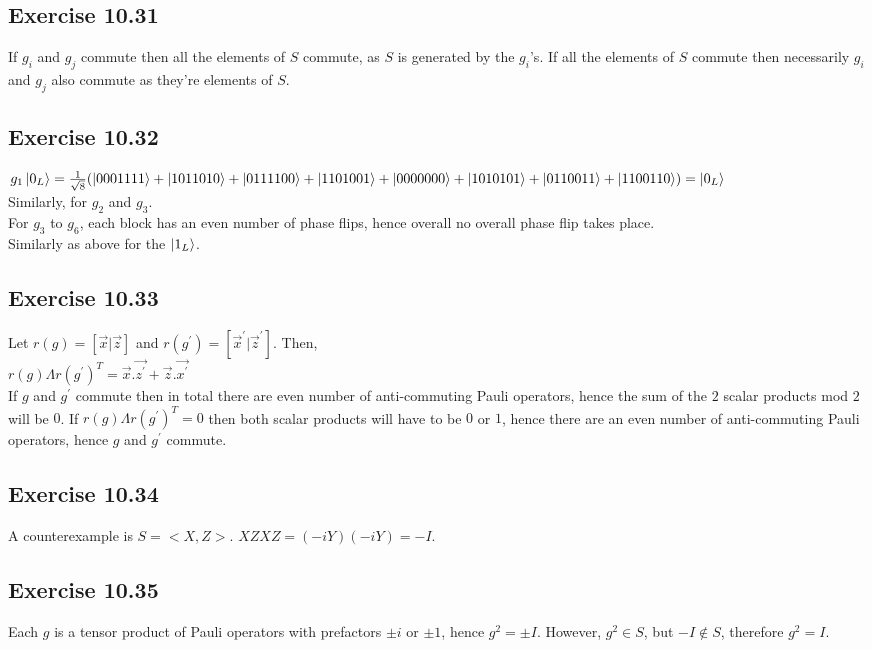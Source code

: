 \documentclass[a4paper,12pt]{article}
\begin{document}
\subsection*{Exercise 10.31}
If $g_i$ and $g_j$ commute then all the elements of $S$ commute, as
$S$ is generated by the $g_i$'s. If all the elements of $S$ commute
then necessarily $g_i$ and $g_j$ also commute as they're elements
of $S$.
\subsection*{Exercise 10.32}
$g_1\ket{0_L}=\frac{1}{\sqrt{8}}(\ket{0001111}+\ket{1011010}+
\ket{0111100}+\ket{1101001}+\ket{0000000}+\ket{1010101}
+\ket{0110011}+\ket{1100110})=\ket{0_L}$\\
Similarly, for $g_2$ and $g_3$.\\
For $g_3$ to $g_6$, each block has an even number of phase flips, hence
overall no overall phase flip takes place.\\
Similarly as above for the $\ket{1_L}$.
\subsection*{Exercise 10.33}
Let $r(g)=[\vec{x}|\vec{z}]$ and
$r(g^\prime)=[\vec{x}^\prime|\vec{z}^\prime]$. Then, \\
$r(g)\Lambda r(g^\prime)^T=\vec{x}.\vec{z^\prime}+
\vec{z}.\vec{x^\prime}$\\
If $g$ and $g^\prime$ commute then in total there are even number of
anti-commuting Pauli operators, hence the sum of the $2$ scalar products mod $2$
will be $0$. If $r(g)\Lambda r(g^\prime)^T=0$ then both scalar products will have to be $0$ or
$1$, hence there are an even number of anti-commuting Pauli operators, hence
$g$ and $g^\prime$ commute.
\subsection*{Exercise 10.34}
A counterexample is $S=<X, Z>$. $XZXZ=(-iY)(-iY)=-I$. 
\subsection*{Exercise 10.35}
Each $g$ is a tensor product of Pauli operators with prefactors
$\pm i$ or $\pm 1$, hence 
$g^2=\pm I$. However, $g^2\in S$, but $-I\notin S$, therefore
$g^2=I$.
\end{document}
